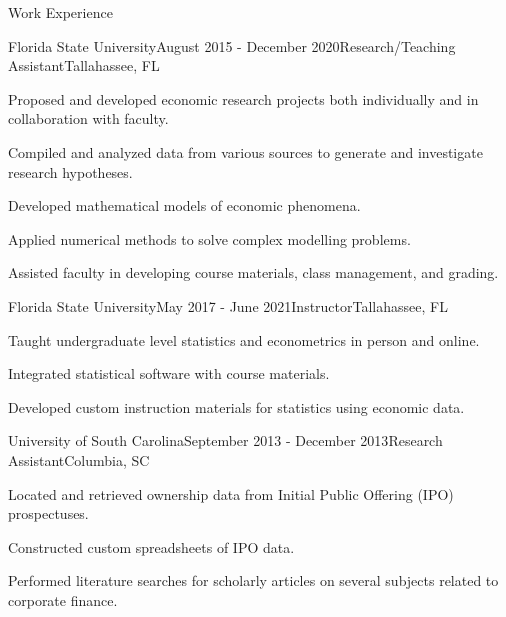 \documentclass{resume} %
\begin{document}
\begin{rSection}{Work Experience}

\begin{rSubsection}{Florida State University}{August 2015 - December 2020}{Research/Teaching Assistant}{Tallahassee, FL}
\item Proposed and developed economic research projects both individually and in collaboration with faculty.
\item Compiled and analyzed data from various sources to generate and investigate research hypotheses.
\item Developed mathematical models of economic phenomena.
\item Applied numerical methods to solve complex modelling problems.
\item Assisted faculty in developing course materials, class management, and grading.

\end{rSubsection}


\begin{rSubsection}{Florida State University}{May 2017 - June 2021}{Instructor}{Tallahassee, FL}
\item Taught undergraduate level statistics and econometrics in person and online.
\item Integrated statistical software with course materials.
\item Developed custom instruction materials for statistics using economic data.
\end{rSubsection}


\begin{rSubsection}{University of South Carolina}{September 2013 - December 2013}{Research Assistant}{Columbia, SC}
\item Located and retrieved ownership data from Initial Public Offering (IPO) prospectuses.
\item Constructed custom spreadsheets of IPO data.
\item Performed literature searches for scholarly articles on several subjects related to corporate finance.
\end{rSubsection}


\end{rSection}
\end{document}
